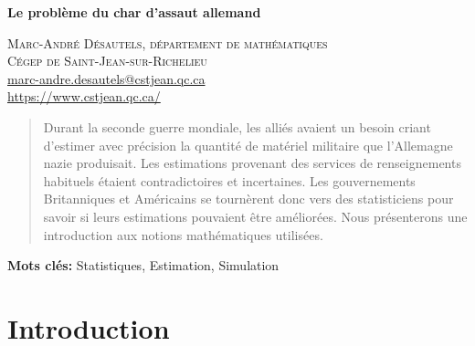 \documentclass[10pt]{article}
\begin{document}


\renewcommand{\tablename}{\textsc{Tableau}}

\begin{center}
\textsf{\LARGE \textbf{Le problème du char d'assaut allemand}}
\end{center}

\begin{flushright}
\textsc{Marc-André Désautels, département de mathématiques} \\
\textsc{Cégep de Saint-Jean-sur-Richelieu} \\
\href{mailto:marc-andre.desautels@cstjean.qc.ca}{marc-andre.desautels@cstjean.qc.ca} \\
\href{https://www.cstjean.qc.ca/}{https://www.cstjean.qc.ca/}
\end{flushright}


\baselineskip


\begin{abstract}

Durant la seconde guerre mondiale, les alliés avaient un besoin criant
d'estimer avec précision la quantité de matériel militaire que
l'Allemagne nazie produisait. Les estimations provenant des services de
renseignements habituels étaient contradictoires et incertaines. Les
gouvernements Britanniques et Américains se tournèrent donc vers des
statisticiens pour savoir si leurs estimations pouvaient être
améliorées. Nous présenterons une introduction aux notions mathématiques
utilisées.

\end{abstract}

\textbf{Mots clés: } Statistiques, Estimation, Simulation

\bigskip

\section{\texorpdfstring{Introduction
\label{intro}}{Introduction }}\label{introduction}
\end{document}
